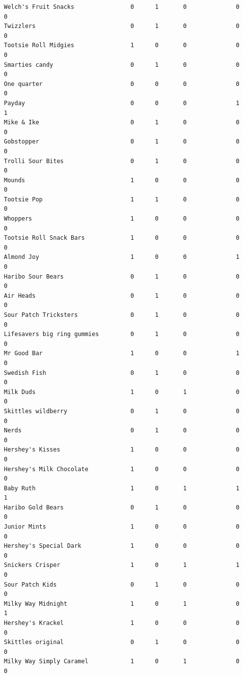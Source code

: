 \documentclass[
  letterpaper,
  DIV=11,
  numbers=noendperiod]{scrartcl}
\begin{document}
\begin{verbatim}
Welch's Fruit Snacks                0      1       0              0      0
Twizzlers                           0      1       0              0      0
Tootsie Roll Midgies                1      0       0              0      0
Smarties candy                      0      1       0              0      0
One quarter                         0      0       0              0      0
Payday                              0      0       0              1      1
Mike & Ike                          0      1       0              0      0
Gobstopper                          0      1       0              0      0
Trolli Sour Bites                   0      1       0              0      0
Mounds                              1      0       0              0      0
Tootsie Pop                         1      1       0              0      0
Whoppers                            1      0       0              0      0
Tootsie Roll Snack Bars             1      0       0              0      0
Almond Joy                          1      0       0              1      0
Haribo Sour Bears                   0      1       0              0      0
Air Heads                           0      1       0              0      0
Sour Patch Tricksters               0      1       0              0      0
Lifesavers big ring gummies         0      1       0              0      0
Mr Good Bar                         1      0       0              1      0
Swedish Fish                        0      1       0              0      0
Milk Duds                           1      0       1              0      0
Skittles wildberry                  0      1       0              0      0
Nerds                               0      1       0              0      0
Hershey's Kisses                    1      0       0              0      0
Hershey's Milk Chocolate            1      0       0              0      0
Baby Ruth                           1      0       1              1      1
Haribo Gold Bears                   0      1       0              0      0
Junior Mints                        1      0       0              0      0
Hershey's Special Dark              1      0       0              0      0
Snickers Crisper                    1      0       1              1      0
Sour Patch Kids                     0      1       0              0      0
Milky Way Midnight                  1      0       1              0      1
Hershey's Krackel                   1      0       0              0      0
Skittles original                   0      1       0              0      0
Milky Way Simply Caramel            1      0       1              0      0

\end{verbatim}
\end{document}
